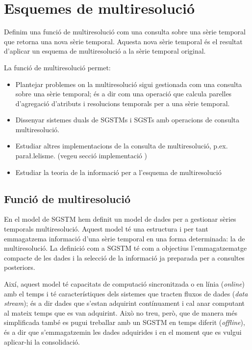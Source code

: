 
\chapter{Esquemes de multiresolució}

\todo{}


Definim una funció de multiresolució com una consulta sobre una sèrie
temporal que retorna una nova sèrie temporal. Aquesta nova sèrie
temporal és el resultat d'aplicar un esquema de multiresolució a la
sèrie temporal original.



La funció de multiresolució permet:

\begin{itemize}

\item Plantejar problemes on la multiresolució sigui gestionada com una consulta
  sobre una sèrie temporal; és a dir com una operació que calcula
  parelles d'agregació d'atributs i resolucions temporals per a una
  sèrie temporal.

\item Dissenyar sistemes duals de \glspl{SGSTM} i \glspl{SGST} amb operacions
  de consulta multiresolució.

\item Estudiar altres implementacions de la consulta de multiresolució, p.ex. para\l.lelisme. (vegeu secció implementació \todo{})

\item Estudiar la teoria de la informació per a l'esquema de
  multiresolució

\end{itemize}





\section{Funció de multiresolució}
\label{sec:multiresolucio:funcio}

En el model de \gls{SGSTM} hem definit un model de dades per a
gestionar sèries temporals multiresolució. Aquest model té una
estructura i per tant emmagatzema informació d'una sèrie temporal en
una forma determinada: la de multiresolució.  La definició com a
\gls{SGSTM} té com a objectius l'emmagatzematge compacte de les dades
i la selecció de la informació ja preparada per a consultes
posteriors.

Així, aquest model té capacitats de computació
sincronitzada o en línia (\emph{online}) amb el temps i té
característiques dels sistemes que tracten fluxos de dades (\emph{data
  stream}); és a dir dades que s'estan adquirint contínuament i cal
anar computant al mateix temps que es van adquirint. Això no treu,
però, que de manera més simplificada també es pugui treballar amb un
\gls{SGSTM} en temps diferit (\emph{offline}), és a dir que
s'emmagatzemin les dades adquirides i en el moment que es vulgui
aplicar-hi la consolidació.





